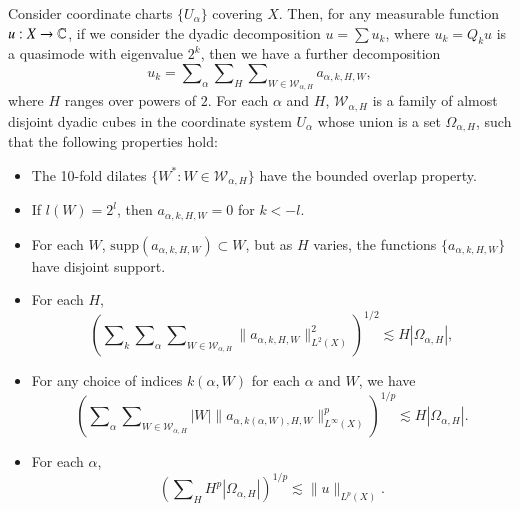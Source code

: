 \begin{lemma} \label{atomicdecompositionlemma}
    Consider coordinate charts $\{ U_\alpha \}$ covering $X$. Then, for any measurable function $u: X \to \operatorname{\mathbb{C}}$, if we consider the dyadic decomposition $u = \sum u_k$, where $u_k = Q_k u$ is a quasimode with eigenvalue $2^k$, then we have a further decomposition
    \[ u_k = \sum\nolimits_\alpha \sum\nolimits_H \sum\nolimits_{W \in \mathcal{W}_{\alpha,H}} a_{\alpha,k,H,W}, \]
    where $H$ ranges over powers of $2$. For each $\alpha$ and $H$, $\mathcal{W}_{\alpha,H}$ is a family of almost disjoint dyadic cubes in the coordinate system $U_\alpha$ whose union is a set $\Omega_{\alpha,H}$, such that the following properties hold:
    \begin{itemize}
        \item The 10-fold dilates $\{ W^* : W \in \mathcal{W}_{\alpha,H} \}$ have the bounded overlap property.

        \item If $l(W) = 2^l$, then $a_{\alpha,k,H,W} = 0$ for $k < -l$.

        \item For each $W$, $\text{supp}(a_{\alpha,k,H,W}) \subset W$, but as $H$ varies, the functions $\{ a_{\alpha,k,H,W} \}$ have disjoint support.

        \item For each $H$,
        \[ \left( \sum\nolimits_k \sum\nolimits_\alpha \sum\nolimits_{W \in \mathcal{W}_{\alpha,H}} \| a_{\alpha,k,H,W} \|_{L^2(X)}^2 \right)^{1/2} \lesssim H |\Omega_{\alpha,H}|, \]

        \item For any choice of indices $k(\alpha,W)$ for each $\alpha$ and $W$, we have
        \[ \left( \sum\nolimits_\alpha \sum\nolimits_{W \in \mathcal{W}_{\alpha,H}} |W| \| a_{\alpha,k(\alpha,W),H,W} \|_{L^\infty(X)}^p \right)^{1/p} \lesssim H |\Omega_{\alpha,H}|. \]

        \item For each $\alpha$,
        \[ \left( \sum\nolimits_H H^p |\Omega_{\alpha,H}| \right)^{1/p} \lesssim \| u \|_{L^p(X)}. \]
    \end{itemize}
\end{lemma}

